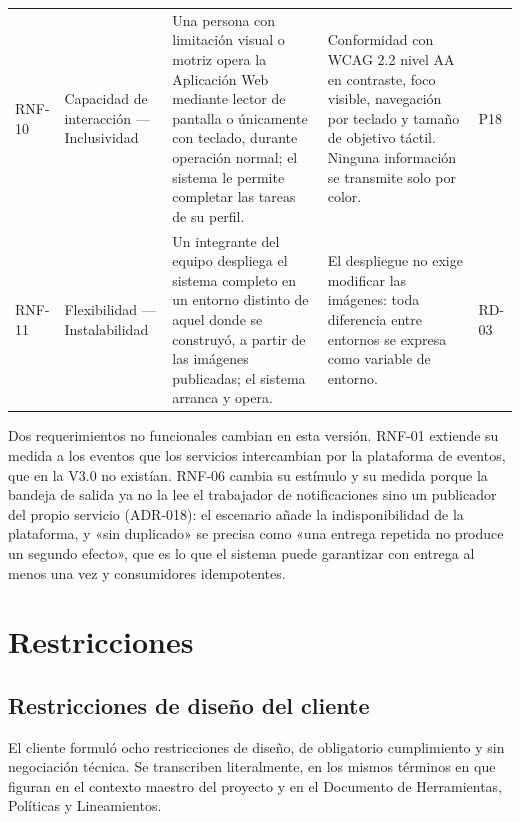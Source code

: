 \documentclass[11pt,a4paper]{article}
\begin{document}
\begin{longtable}{L{1.2cm} L{2.5cm} L{6.4cm} L{2.6cm} L{1.4cm}}
RNF-10 & Capacidad de interacción — Inclusividad & Una persona con limitación visual o motriz opera la Aplicación Web mediante lector de pantalla o únicamente con teclado, durante operación normal; el sistema le permite completar las tareas de su perfil. & Conformidad con WCAG 2.2 nivel AA en contraste, foco visible, navegación por teclado y tamaño de objetivo táctil. Ninguna información se transmite solo por color. & P18 \\

RNF-11 & Flexibilidad — Instalabilidad & Un integrante del equipo despliega el sistema completo en un entorno distinto de aquel donde se construyó, a partir de las imágenes publicadas; el sistema arranca y opera. & El despliegue no exige modificar las imágenes: toda diferencia entre entornos se expresa como variable de entorno. & RD-03 \\

\end{longtable}

\vspace{0.2cm}
\noindent Dos requerimientos no funcionales cambian en esta versión. RNF-01 extiende su medida a los eventos que los servicios intercambian por la plataforma de eventos, que en la V3.0 no existían. RNF-06 cambia su estímulo y su medida porque la bandeja de salida ya no la lee el trabajador de notificaciones sino un publicador del propio servicio (ADR-018): el escenario añade la indisponibilidad de la plataforma, y «sin duplicado» se precisa como «una entrega repetida no produce un segundo efecto», que es lo que el sistema puede garantizar con entrega al menos una vez y consumidores idempotentes.

\section{Restricciones}
\label{sec:restricciones}

\subsection{Restricciones de diseño del cliente}

El cliente formuló ocho restricciones de diseño, de obligatorio cumplimiento y sin negociación técnica. Se transcriben literalmente, en los mismos términos en que figuran en el contexto maestro del proyecto y en el Documento de Herramientas, Políticas y Lineamientos.
\end{document}
